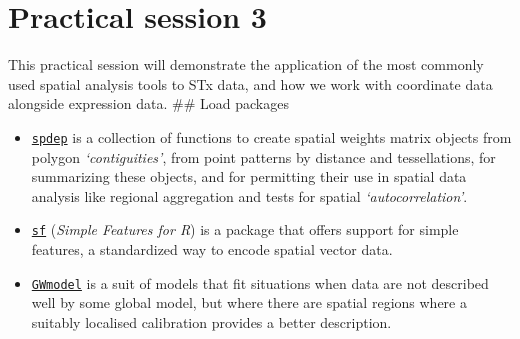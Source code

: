 \documentclass[
]{book}
\newenvironment{Shaded}{\begin{snugshade}}{\end{snugshade}}
\newcommand{\CommentTok}[1]{\textcolor[rgb]{0.56,0.35,0.01}{\textit{#1}}}
\begin{document}
\begin{Shaded}
\end{Shaded}

\hypertarget{practical-session-3}{%
\chapter{Practical session 3}\label{practical-session-3}}

This practical session will demonstrate the application of the most commonly used spatial analysis tools to STx data, and how we work with coordinate data alongside expression data. \#\# Load packages

\begin{itemize}
\item
  \href{https://cran.r-project.org/web/packages/spdep/index.html}{\texttt{spdep}} is a collection of functions to create spatial weights matrix objects from polygon \emph{`contiguities'}, from point patterns by distance and tessellations, for summarizing these objects, and for permitting their use in spatial data analysis like regional aggregation and tests for spatial \emph{`autocorrelation'}.
\item
  \href{https://cran.r-project.org/web/packages/sf/index.html}{\texttt{sf}} (\emph{Simple Features for R}) is a package that offers support for simple features, a standardized way to encode spatial vector data.
\item
  \href{https://cran.r-project.org/web/packages/GWmodel/index.html}{\texttt{GWmodel}} is a suit of models that fit situations when data are not described well by some global model, but where there are spatial regions where a suitably localised calibration provides a better description.
\end{itemize}
\end{document}

